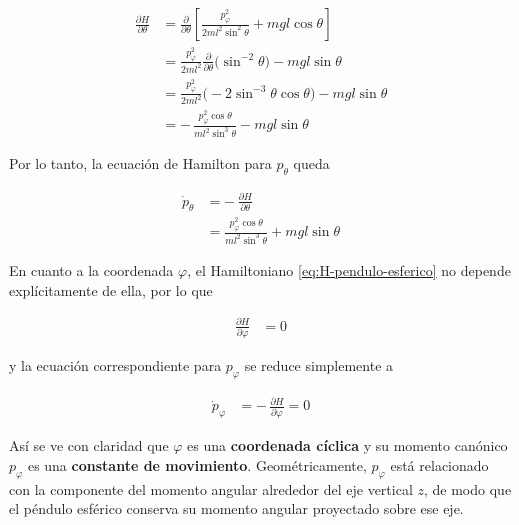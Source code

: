 \documentclass{article}
\begin{document}
\begin{equation}
\begin{split}
\frac{\partial H}{\partial \theta}
&= \frac{\partial}{\partial\theta}
   \left[
     \frac{p_{\varphi}^{2}}{2 m l^{2}\sin^{2}\theta}
     + m g l\cos\theta
   \right] \\[4pt]
&= \frac{p_{\varphi}^{2}}{2 m l^{2}}
   \frac{\partial}{\partial\theta}\bigl(\sin^{-2}\theta\bigr)
   - m g l\sin\theta \\[4pt]
&= \frac{p_{\varphi}^{2}}{2 m l^{2}}
   \bigl(-2\sin^{-3}\theta\cos\theta\bigr)
   - m g l\sin\theta \\[4pt]
&= -\,\frac{p_{\varphi}^{2}\cos\theta}{m l^{2}\sin^{3}\theta}
   - m g l\sin\theta
\end{split}\label{eq:dH-dtheta}
\end{equation}

Por lo tanto, la ecuación de Hamilton para \(p_{\theta}\) queda

\begin{equation}
\begin{split}
\dot p_{\theta}
&= -\,\frac{\partial H}{\partial \theta} \\[4pt]
&= \frac{p_{\varphi}^{2}\cos\theta}{m l^{2}\sin^{3}\theta}
   + m g l\sin\theta
\end{split}\label{eq:ecuacion-H-ptheta}
\end{equation}

En cuanto a la coordenada \(\varphi\), el Hamiltoniano
\eqref{eq:H-pendulo-esferico} no depende explícitamente de ella, por lo que

\begin{equation}
\begin{split}
\frac{\partial H}{\partial \varphi} &= 0
\end{split}\label{eq:dH-dphi}
\end{equation}

y la ecuación correspondiente para \(p_{\varphi}\) se reduce simplemente a

\begin{equation}
\begin{split}
\dot p_{\varphi}
&= -\,\frac{\partial H}{\partial \varphi}
 = 0
\end{split}\label{eq:ecuacion-H-pphi}
\end{equation}

Así se ve con claridad que \(\varphi\) es una \textbf{coordenada cíclica} y su momento
canónico \(p_{\varphi}\) es una \textbf{constante de movimiento}.  
Geométricamente, \(p_{\varphi}\) está relacionado con la componente del momento
angular alrededor del eje vertical \(z\), de modo que el péndulo esférico conserva
su momento angular proyectado sobre ese eje.
\end{document}
